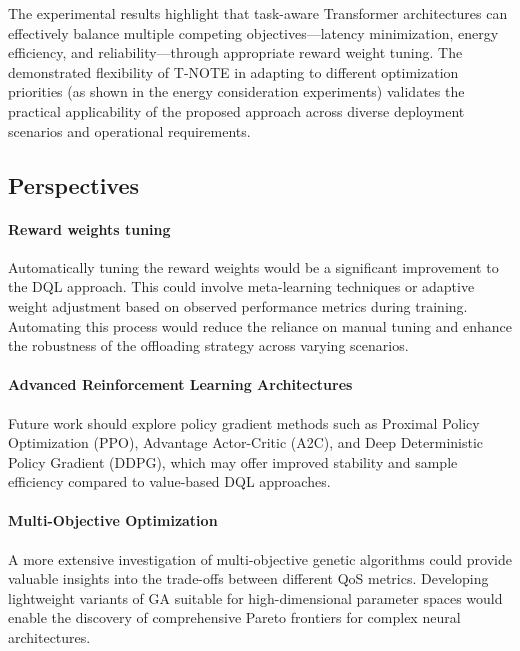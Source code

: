 \documentclass[preprint,3p,authoryear]{elsarticle}
\begin{document}
The experimental results highlight that task-aware Transformer architectures can effectively balance multiple competing objectives—latency minimization, energy efficiency, and reliability—through appropriate reward weight tuning. The demonstrated flexibility of T-NOTE in adapting to different optimization priorities (as shown in the energy consideration experiments) validates the practical applicability of the proposed approach across diverse deployment scenarios and operational requirements.

\subsection{Perspectives}


\paragraph{Reward weights tuning}

Automatically tuning the reward weights would be a significant improvement to the DQL approach. This could involve meta-learning techniques or adaptive weight adjustment based on observed performance metrics during training. Automating this process would reduce the reliance on manual tuning and enhance the robustness of the offloading strategy across varying scenarios.


\paragraph{Advanced Reinforcement Learning Architectures}
Future work should explore policy gradient methods such as Proximal Policy Optimization (PPO), Advantage Actor-Critic (A2C), and Deep Deterministic Policy Gradient (DDPG), which may offer improved stability and sample efficiency compared to value-based DQL approaches.


\paragraph{Multi-Objective Optimization}
A more extensive investigation of multi-objective genetic algorithms could provide valuable insights into the trade-offs between different QoS metrics. Developing lightweight variants of GA suitable for high-dimensional parameter spaces would enable the discovery of comprehensive Pareto frontiers for complex neural architectures.



  
 
\end{document}
